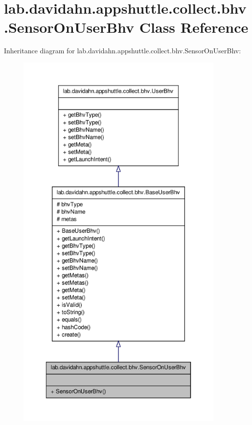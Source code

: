 \hypertarget{classlab_1_1davidahn_1_1appshuttle_1_1collect_1_1bhv_1_1_sensor_on_user_bhv}{\section{lab.\-davidahn.\-appshuttle.\-collect.\-bhv.\-Sensor\-On\-User\-Bhv \-Class \-Reference}
\label{classlab_1_1davidahn_1_1appshuttle_1_1collect_1_1bhv_1_1_sensor_on_user_bhv}
}


\-Inheritance diagram for lab.\-davidahn.\-appshuttle.\-collect.\-bhv.\-Sensor\-On\-User\-Bhv\-:
\nopagebreak
\begin{figure}[H]
\begin{center}
\leavevmode
\includegraphics[height=550pt]{classlab_1_1davidahn_1_1appshuttle_1_1collect_1_1bhv_1_1_sensor_on_user_bhv__inherit__graph}
\end{center}
\end{figure}


